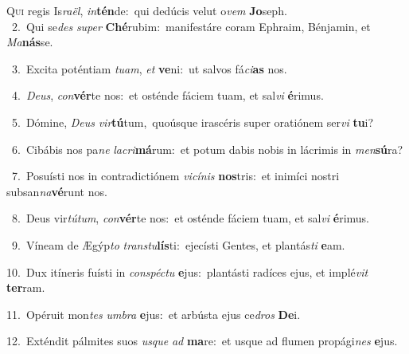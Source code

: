 \lettrine{\initial\textcolor{\initialcolor}{Q}}{ui} regis Is\-\textit{ra}\-\textit{ël}, \textit{in}\-\textbf{tén}de:~\star qui dedúcis velut o\textit{vem} \textbf{Jo}\-seph.\\
{\numbfont\textcolor{\numbcolor}{~2.}}~Qui se\textit{des} \textit{su}\-\textit{per} \textbf{Ché}\-rubim:~\star manifestáre coram Ephraim, Bénjamin, et \textit{Ma}\-\textbf{nás}se.\par
{\numbfont\textcolor{\numbcolor}{~3.}}~Excita poténtiam \textit{tu}\-\textit{am}, \textit{et} \textbf{ve}\-ni:~\star ut salvos fá\-\textit{ci}\-\textbf{as} nos.\par
{\numbfont\textcolor{\numbcolor}{~4.}}~\-\textit{De}\-\textit{us}, \textit{con}\-\textbf{vér}te nos:~\star et osténde fáciem tuam, et sal\textit{vi} \textbf{é}\-rimus.\par
{\numbfont\textcolor{\numbcolor}{~5.}}~Dómine, \textit{De}\-\textit{us} \textit{vir}\-\textbf{tú}tum,~\star quoúsque irascéris super oratiónem ser\textit{vi} \textbf{tu}\-i?\par
{\numbfont\textcolor{\numbcolor}{~6.}}~Cibábis nos pa\textit{ne} \textit{la}\-\textit{cri}\textbf{má}rum:~\star et potum dabis nobis in lácrimis in \textit{men}\-\textbf{sú}ra?\par
{\numbfont\textcolor{\numbcolor}{~7.}}~Posuísti nos in contradictiónem \textit{vi}\-\textit{cí}\textit{nis} \textbf{nos}\-tris:~\star et inimíci nostri subsan\-\textit{na}\-\textbf{vé}runt nos.\par
{\numbfont\textcolor{\numbcolor}{~8.}}~Deus vir\-\textit{tú}\-\textit{tum}, \textit{con}\-\textbf{vér}te nos:~\star et osténde fáciem tuam, et sal\textit{vi} \textbf{é}\-rimus.\par
{\numbfont\textcolor{\numbcolor}{~9.}}~Víneam de Ægýp\textit{to} \textit{trans}\-\textit{tu}\textbf{lís}ti:~\star ejecísti Gentes, et plantás\textit{ti} \textbf{e}\-am.\par
{\numbfont\textcolor{\numbcolor}{10.}}~Dux itíneris fuísti in \textit{con}\-\textit{spéc}\textit{tu} \textbf{e}\-jus:~\star plantásti radíces ejus, et implé\textit{vit} \textbf{ter}\-ram.\par
{\numbfont\textcolor{\numbcolor}{11.}}~Opéruit mon\textit{tes} \textit{um}\-\textit{bra} \textbf{e}\-jus:~\star et arbústa ejus ce\textit{dros} \textbf{De}\-i.\par
{\numbfont\textcolor{\numbcolor}{12.}}~Exténdit pálmites suos \textit{us}\-\textit{que} \textit{ad} \textbf{ma}\-re:~\star et usque ad flumen propági\textit{nes} \textbf{e}\-jus.\par
